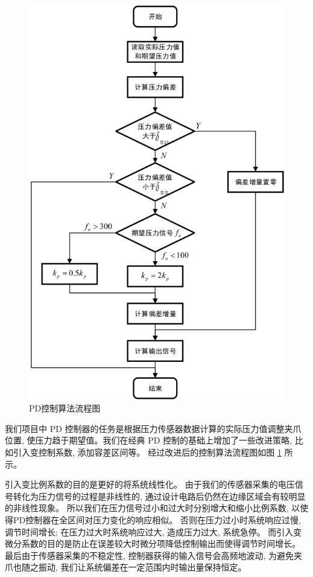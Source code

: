 \begin{figure}[!ht]
  \centering
  \includegraphics[scale=0.54]{chapter03/pic/3-3}
  \caption{PD控制算法流程图}
  \label{fig:3-3}
  \vspace{-0.3cm}
\end{figure}

我们项目中 PD 控制器的任务是根据压力传感器数据计算的实际压力值调整夹爪位置,
使压力趋于期望值。我们在经典 PD 控制的基础上增加了一些改进策略,
比如引入变控制系数, 添加容差区间等。
经过改进后的控制算法流程图如图 \ref{fig:3-3} 所示。

引入变比例系数的目的是更好的将系统线性化。
由于我们的传感器采集的电压信号转化为压力信号的过程是非线性的,
通过设计电路后仍然在边缘区域会有较明显的非线性现象。
所以我们在压力信号过小和过大时分别增大和缩小比例系数,
以使得PD控制器在全区间对压力变化的响应相似。
否则在压力过小时系统响应过慢, 调节时间增长;
在压力过大时系统响应过大, 造成压力过大, 系统急停。
而引入变微分系数的目的是防止在误差较大时微分项降低控制输出而使得调节时间增长。
最后由于传感器采集的不稳定性, 控制器获得的输入信号会高频地波动, 为避免夹爪也随之振动,
我们让系统偏差在一定范围内时输出量保持恒定。

